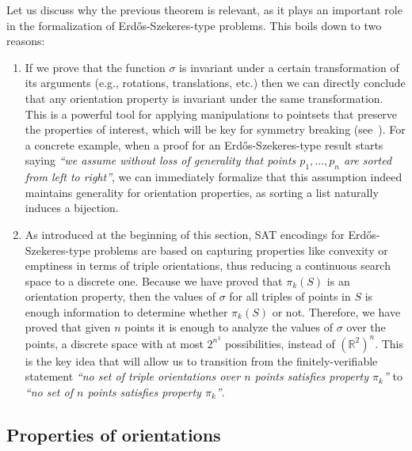 Let us discuss why the previous theorem is relevant, as it plays an important role in the formalization of Erd\H{o}s-Szekeres-type problems. This boils down to two reasons:
\begin{enumerate}
  \item If we prove that the function $\sigma$ is invariant under a certain transformation of its arguments (e.g., rotations, translations, etc.) then we can directly conclude that any orientation property is invariant under the same transformation. This is a powerful tool for applying manipulations to pointsets that preserve the properties of interest, which will be key for symmetry breaking (see~). For a concrete example, when a proof for an Erd\H{o}s-Szekeres-type result starts saying \emph{``we assume without loss of generality that points $p_1, \ldots, p_n$ are sorted from left to right''}, we can immediately formalize that this assumption indeed maintains generality for orientation properties, as sorting a list naturally induces a bijection.
  \item As introduced at the beginning of this section, SAT encodings for Erd\H{o}s-Szekeres-type problems are based on capturing properties like convexity or emptiness in terms of triple orientations, thus reducing a continuous search space to a discrete one. Because we have proved that $\pi_k(S)$ is an orientation property, then the values of $\sigma$ for all triples of points in $S$ is enough information to determine whether $\pi_k(S)$ or not.  Therefore, we have proved that given $n$ points it is enough to analyze the values of $\sigma$ over the points, a discrete space with at most $2^{n^3}$ possibilities, instead of $\left(\mathbb{R}^2\right)^n$. This is the key idea that will allow us to transition from the finitely-verifiable statement \emph{``no set of triple orientations over $n$ points satisfies property $\pi_k$''} to \emph{``no set of $n$ points satisfies property $\pi_k$''}.
\end{enumerate}

\subsection{Properties of orientations}\label{sec:sigma-props}

